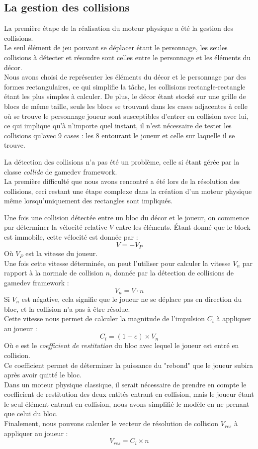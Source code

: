 \documentclass[10pt]{report}
\begin{document}
\subsection{La gestion des collisions}
La première étape de la réalisation du moteur physique a été la gestion des collisions.\\
Le seul élément de jeu pouvant se déplacer étant le personnage, les seules collisions à détecter et résoudre sont celles entre le personnage et les éléments du décor.\\
Nous avons choisi de représenter les éléments du décor et le personnage par des formes rectangulaires, ce qui simplifie la tâche, les collisions rectangle-rectangle étant les plus simples à calculer.
De plus, le décor étant stocké sur une grille de blocs de même taille, seuls les blocs se trouvant dans les cases adjacentes à celle où se trouve le personnage joueur sont susceptibles d'entrer en collision avec lui, ce qui implique qu'à n'importe quel instant, il n'est nécessaire de tester les collisions qu'avec 9 cases :
les 8 entourant le joueur et celle sur laquelle il se trouve.

La détection des collisions n'a pas été un problème, celle si étant gérée par la classe \emph{collide} de gamedev framework.\\
La première difficulté que nous avons rencontré a été lors de la résolution des collisions, ceci restant une étape complexe dans la création d'un moteur physique même lorsqu'uniquement des rectangles sont impliqués.\par

Une fois une collision détectée entre un bloc du décor et le joueur, on commence par déterminer la vélocité relative \(V\) entre les éléments.
Étant donné que le block est immobile, cette vélocité est donnée par :
\[ V =  - V_{P} \]
Où \(V_{P}\) est la vitesse du joueur.\\
Une fois cette vitesse déterminée, on peut l'utiliser pour calculer la vitesse \(V_{n}\) par rapport à la normale de collision \(n\), donnée par la détection de collisions de gamedev framework :
\[ V_{n} = V \cdot n \]
Si \(V_{n}\) est négative, cela signifie que le joueur ne se déplace pas en direction du bloc, et la collision n'a pas à être résolue.\\
Cette vitesse nous permet de calculer la magnitude de l'impulsion \(C_{i}\) à appliquer au joueur :\\
\[ C_{i} = (1 + e) \times V_{n} \]
Où e est le \emph{coefficient de restitution} du bloc avec lequel le joueur est entré en collision.\\
Ce coefficient permet de déterminer la puissance du "rebond" que le joueur subira après avoir quitté le bloc.\\
Dans un moteur physique classique, il serait nécessaire de prendre en compte le coefficient de restitution des deux entités entrant en collision, mais le joueur étant le seul élément entrant en collision, nous avons simplifié le modèle en ne prenant que celui du bloc.\\
Finalement, nous pouvons calculer le vecteur de résolution de collision \(V_{res}\) à appliquer au joueur :
\[V_{res} = C_{i} \times n \]
\end{document}
